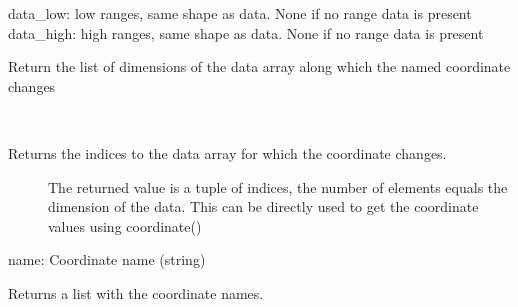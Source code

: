 \documentclass[letterpaper,10pt,english]{sphinxmanual}
\begin{document}
\begin{fulllineitems}
\begin{fulllineitems}
\begin{description}
\begin{description}
\end{description}

data\_low: low ranges, same shape as data. None if no range data is present
data\_high: high ranges, same shape as data. None if no range data is present

\end{description}

\end{fulllineitems}


\begin{fulllineitems}
\label{\detokenize{data_object:flap.data_object.DataObject.coordinate_change_dimensions}}
Return the list of dimensions of the data array along which
the named coordinate changes

\end{fulllineitems}


\begin{fulllineitems}
\label{\detokenize{data_object:flap.data_object.DataObject.coordinate_change_indices}}~\begin{description}
\item[{Returns the indices to the data array for which the coordinate changes.}] \leavevmode
The returned value is a tuple of indices, the number of elements equals the
dimension of the data. This can be directly used to get the coordinate values
using coordinate()

\end{description}

name: Coordinate name (string)

\end{fulllineitems}


\begin{fulllineitems}
\label{\detokenize{data_object:flap.data_object.DataObject.coordinate_names}}
Returns a list with the coordinate names.


\end{fulllineitems}
\end{fulllineitems}
\end{document}
